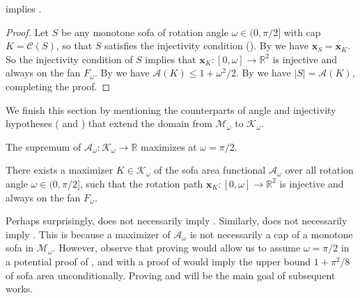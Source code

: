 \begin{proposition}

 implies .

\label{pro:main-cap}
\end{proposition}

\begin{proof}
Let \(S\) be any monotone sofa of rotation angle \(\omega \in (0 ,\pi/2]\) with cap \(K = \mathcal{C}(S)\), so that \(S\) satisfies the injectivity condition (). By  we have \(\mathbf{x}_S = \mathbf{x}_K\). So the injectivity condition of \(S\) implies that \(\mathbf{x}_K : [0, \omega] \to \mathbb{R}^2\) is injective and always on the fan \(F_\omega\). By  we have \(\mathcal{A}(K) \leq 1 + \omega^2/2\). By  we have \(|S| = \mathcal{A}(K)\), completing the proof.
\end{proof}

We finish this section by mentioning the counterparts of angle and injectivity hypotheses ( and ) that extend the domain from \(\mathcal{M}_\omega\) to \(\mathcal{K}_\omega\).

\begin{conjecture}

The supremum of \(\mathcal{A}_{\omega} : \mathcal{K}_\omega \to \mathbb{R}\) maximizes at \(\omega = \pi/2\).

\label{con:angle-cap}
\end{conjecture}

\begin{conjecture}

There exists a maximizer \(K \in \mathcal{K}_\omega\) of the sofa area functional \(\mathcal{A}_{\omega}\) over all rotation angle \(\omega \in (0, \pi/2]\), such that the rotation path \(\mathbf{x}_K : [0, \omega] \to \mathbb{R}^2\) is injective and always on the fan \(F_\omega\).

\label{con:injectivity-cap}
\end{conjecture}

Perhaps surprisingly,  does not necessarily imply . Similarly,  does not necessarily imply . This is because a maximizer of \(\mathcal{A}_\omega\) is not necessarily a cap of a monotone sofa in \(\mathcal{M}_\omega\). However, observe that proving  would allow us to assume \(\omega = \pi/2\) in a potential proof of , and  with a proof of  would imply the upper bound \(1 + \pi^2/8\) of sofa area unconditionally. Proving  and  will be the main goal of subsequent works.